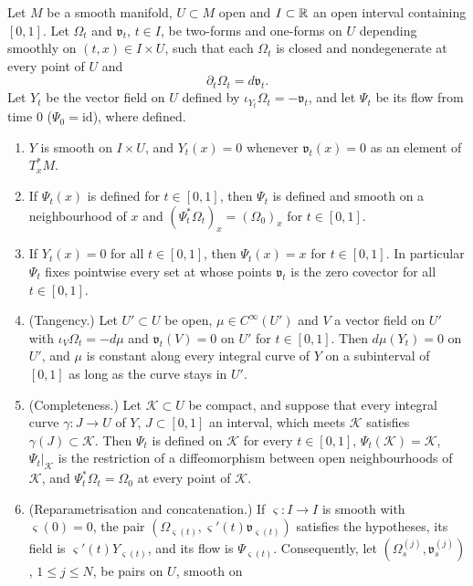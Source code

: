 \begin{lemma}\label{lem:pre-moser}
Let $M$ be a smooth manifold, $U\subset M$ open and $I\subset\mathbb{R}$ an open interval containing $[0,1]$. Let $\Omega_t$ and
$\mathfrak v_t$, $t\in I$, be two-forms and one-forms on $U$ depending smoothly on $(t,x)\in I\times U$, such that each
$\Omega_t$ is closed and nondegenerate at every point of $U$ and
\[
 \partial_t\Omega_t=d\mathfrak v_t .
\]
Let $Y_t$ be the vector field on $U$ defined by $\iota_{Y_t}\Omega_t=-\mathfrak v_t$, and let $\Psi_t$ be its flow from time $0$
($\Psi_0=\mathrm{id}$), where defined.
\begin{enumerate}[label=(\alph*)]
\item $Y$ is smooth on $I\times U$, and $Y_t(x)=0$ whenever $\mathfrak v_t(x)=0$ as an element of $T_x^*M$.
\item If $\Psi_t(x)$ is defined for $t\in[0,1]$, then $\Psi_t$ is defined and smooth on a neighbourhood of $x$ and
$(\Psi_t^*\Omega_t)_x=(\Omega_0)_x$ for $t\in[0,1]$.
\item If $Y_t(x)=0$ for all $t\in[0,1]$, then $\Psi_t(x)=x$ for $t\in[0,1]$. In particular $\Psi_t$ fixes pointwise every set
at whose points $\mathfrak v_t$ is the zero covector for all $t\in[0,1]$.
\item (Tangency.) Let $U'\subset U$ be open, $\mu\in C^\infty(U')$ and $V$ a vector field on $U'$ with
$\iota_V\Omega_t=-d\mu$ and $\mathfrak v_t(V)=0$ on $U'$ for $t\in[0,1]$. Then $d\mu(Y_t)=0$ on $U'$, and $\mu$ is constant along
every integral curve of $Y$ on a subinterval of $[0,1]$ as long as the curve stays in $U'$.
\item (Completeness.) Let $\mathcal K\subset U$ be compact, and suppose that every integral curve $\gamma\colon J\to U$ of $Y$,
$J\subset[0,1]$ an interval, which meets $\mathcal K$ satisfies $\gamma(J)\subset\mathcal K$. Then $\Psi_t$ is defined on $\mathcal K$ for
every $t\in[0,1]$, $\Psi_t(\mathcal K)=\mathcal K$, $\Psi_t|_{\mathcal K}$ is the restriction of a diffeomorphism between open
neighbourhoods of $\mathcal K$, and $\Psi_t^*\Omega_t=\Omega_0$ at every point of $\mathcal K$.
\item (Reparametrisation and concatenation.) If $\varsigma\colon I\to I$ is smooth with $\varsigma(0)=0$, the pair
$(\Omega_{\varsigma(t)},\varsigma'(t)\mathfrak v_{\varsigma(t)})$ satisfies the hypotheses, its field is $\varsigma'(t)Y_{\varsigma(t)}$, and its flow is
$\Psi_{\varsigma(t)}$. Consequently, let $(\Omega^{(j)}_s,\mathfrak v^{(j)}_s)$, $1\le j\le N$, be pairs on $U$, smooth on

\end{enumerate}
\end{lemma}
